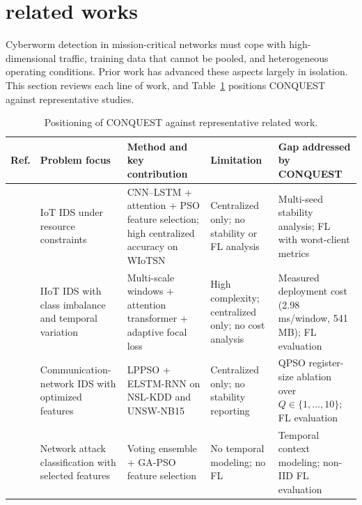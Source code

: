 \documentclass[conference]{IEEEtran}
\begin{document}
\section{\textbf{related works}}
\label{sec:related_works}

Cyberworm detection in mission-critical networks must cope with
high-dimensional traffic, training data that cannot be pooled, and
heterogeneous operating conditions. Prior work has advanced these
aspects largely in isolation. This section reviews each line of work,
and Table~\ref{tab:rw_qualitative} positions CONQUEST against
representative studies.

\begin{table}[!htbp]
\centering
\scriptsize
\caption{Positioning of CONQUEST against representative related work.}
\label{tab:rw_qualitative}
\setlength{\tabcolsep}{5pt}
\renewcommand{\arraystretch}{1.3}
\begin{tabular}{>{\raggedright\arraybackslash}p{1.0cm} >{\raggedright\arraybackslash}p{2.6cm} >{\raggedright\arraybackslash}p{4.0cm} >{\raggedright\arraybackslash}p{3.2cm} >{\raggedright\arraybackslash}p{4.4cm}}
\hline\toprule
\textbf{Ref.} & \textbf{Problem focus} & \textbf{Method and key contribution} & \textbf{Limitation} & \textbf{Gap addressed by CONQUEST} \\
\hline\toprule
\cite{phalaagaehybrid} & IoT IDS under resource constraints & CNN--LSTM + attention + PSO feature selection; high centralized accuracy on WIoTSN & Centralized only; no stability or FL analysis & Multi-seed stability analysis; FL with worst-client metrics \\

\midrule

\cite{yuadaptive} & IIoT IDS with class imbalance and temporal variation & Multi-scale windows + attention transformer + adaptive focal loss & High complexity; centralized only; no cost analysis & Measured deployment cost (2.98\,ms/window, 541\,MB); FL evaluation \\

\midrule

\cite{donkoloptimization} & Communication-network IDS with optimized features & LPPSO + ELSTM-RNN on NSL-KDD and UNSW-NB15 & Centralized only; no stability reporting & QPSO register-size ablation over $Q\in\{1,\dots,10\}$; FL evaluation \\

\midrule

\cite{shrivashybrid} & Network attack classification with selected features & Voting ensemble + GA-PSO feature selection & No temporal modeling; no FL & Temporal context modeling; non-IID FL evaluation \\


\end{tabular}
\end{table}
\end{document}
